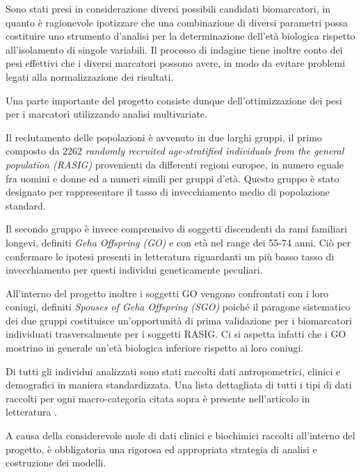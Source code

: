 \documentclass[12pt,openright,twoside,a4paper]{book}
\begin{document}
Sono stati presi in considerazione diversi possibili candidati biomarcatori, in quanto è ragionevole ipotizzare che una combinazione di diversi parametri possa costituire uno strumento d'analisi per la determinazione dell'età biologica rispetto all'isolamento di singole variabili.
Il processo di indagine tiene inoltre conto dei pesi effettivi che i diversi marcatori possono avere, in modo da evitare problemi legati alla normalizzazione dei risultati.

Una parte importante del progetto consiste dunque dell'ottimizzazione dei pesi per i marcatori utilizzando analisi multivariate.

Il reclutamento delle popolazioni è avvenuto in due larghi gruppi, il primo composto da 2262 \textit{randomly recruited age-stratified individuals from the general population (RASIG)} provenienti da differenti regioni europee, in numero eguale fra uomini e donne ed a numeri simili per gruppi d'età.
Questo gruppo è stato designato per rappresentare il tasso di invecchiamento medio di popolazione standard.

Il secondo gruppo è invece comprensivo di soggetti discendenti da rami familiari longevi, definiti \textit{Geha Offspring (GO)} e con età nel range dei 55-74 anni.
Ciò per confermare le ipotesi presenti in letteratura riguardanti un più basso tasso di invecchiamento per questi individui geneticamente peculiari.

All'interno del progetto inoltre i soggetti GO vengono confrontati con i loro coniugi, definiti \textit{Spouses of Geha Offspring (SGO) } poiché il paragone sistematico dei due gruppi costituisce un'opportunità di prima validazione per i biomarcatori individuati trasversalmente per i soggetti RASIG.
Ci si aspetta infatti che i GO mostrino in generale un'età biologica inferiore rispetto ai loro coniugi.

Di tutti gli individui analizzati sono stati raccolti dati antropometrici, clinici e demografici in maniera standardizzata.
Una lista dettagliata di tutti i tipi di dati raccolti per ogni macro-categoria citata sopra è presente nell'articolo in letteratura \cite{markage}.

A causa della considerevole mole di dati clinici e biochimici  raccolti all'interno del progetto, è obbligatoria una rigorosa ed appropriata strategia di analisi e costruzione dei modelli.
\end{document}
